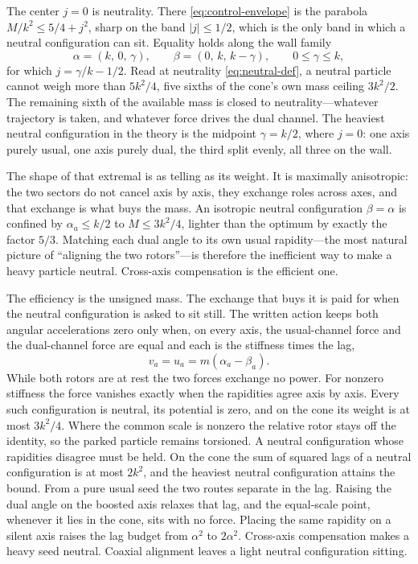 \documentclass[a4paper]{article}
\begin{document}
The center $j=0$ is neutrality. There \eqref{eq:control-envelope} is the parabola $M/k^2\le 5/4+j^2$, sharp on the band $|j|\le 1/2$, which is the only band in which a neutral configuration can sit. Equality holds along the wall family
\[
\alpha=(k,\,0,\,\gamma),\qquad\beta=(0,\,k,\,k-\gamma),\qquad 0\le\gamma\le k,
\]
for which $j=\gamma/k-1/2$. Read at neutrality \eqref{eq:neutral-def}, a neutral particle cannot weigh more than $5k^2/4$, five sixths of the cone's own mass ceiling $3k^2/2$. The remaining sixth of the available mass is closed to neutrality---whatever trajectory is taken, and whatever force drives the dual channel. The heaviest neutral configuration in the theory is the midpoint $\gamma=k/2$, where $j=0$: one axis purely usual, one axis purely dual, the third split evenly, all three on the wall.

The shape of that extremal is as telling as its weight. It is maximally anisotropic: the two sectors do not cancel axis by axis, they exchange roles across axes, and that exchange is what buys the mass. An isotropic neutral configuration $\beta=\alpha$ is confined by $\alpha_a\le k/2$ to $M\le 3k^2/4$, lighter than the optimum by exactly the factor $5/3$. Matching each dual angle to its own usual rapidity---the most natural picture of ``aligning the two rotors''---is therefore the inefficient way to make a heavy particle neutral. Cross-axis compensation is the efficient one.

The efficiency is the unsigned mass. The exchange that buys it is paid for when the neutral configuration is asked to sit still. The written action keeps both angular accelerations zero only when, on every axis, the usual-channel force and the dual-channel force are equal and each is the stiffness times the lag,
\[
v_a=u_a=m(\alpha_a-\beta_a).
\]
While both rotors are at rest the two forces exchange no power. For nonzero stiffness the force vanishes exactly when the rapidities agree axis by axis. Every such configuration is neutral, its potential is zero, and on the cone its weight is at most $3k^2/4$. Where the common scale is nonzero the relative rotor stays off the identity, so the parked particle remains torsioned. A neutral configuration whose rapidities disagree must be held. On the cone the sum of squared lags of a neutral configuration is at most $2k^2$, and the heaviest neutral configuration attains the bound. From a pure usual seed the two routes separate in the lag. Raising the dual angle on the boosted axis relaxes that lag, and the equal-scale point, whenever it lies in the cone, sits with no force. Placing the same rapidity on a silent axis raises the lag budget from $\alpha^2$ to $2\alpha^2$. Cross-axis compensation makes a heavy seed neutral. Coaxial alignment leaves a light neutral configuration sitting.
\end{document}
